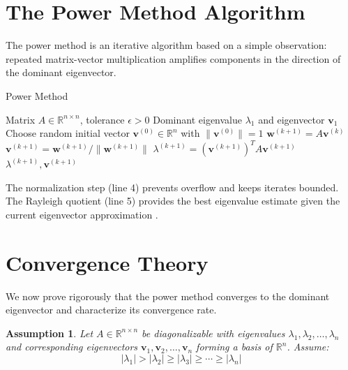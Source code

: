 \documentclass[11pt,a4paper]{article}
\newtheorem{assumption}{Assumption}
\begin{document}
\section{The Power Method Algorithm}
\label{sec:algorithm}

The power method is an iterative algorithm based on a simple observation: repeated matrix-vector multiplication amplifies components in the direction of the dominant eigenvector.

\begin{algorithm}[h]
\caption{Power Method}
\label{alg:power}
\begin{algorithmic}[1]
\Require Matrix $A \in \mathbb{R}^{n \times n}$, tolerance $\epsilon > 0$
\Ensure Dominant eigenvalue $\lambda_1$ and eigenvector $\mathbf{v}_1$
\State Choose random initial vector $\mathbf{v}^{(0)} \in \mathbb{R}^n$ with $\|\mathbf{v}^{(0)}\| = 1$
    \State $\mathbf{w}^{(k+1)} = A\mathbf{v}^{(k)}$ 
    \State $\mathbf{v}^{(k+1)} = \mathbf{w}^{(k+1)} / \|\mathbf{w}^{(k+1)}\|$ 
    \State $\lambda^{(k+1)} = (\mathbf{v}^{(k+1)})^T A \mathbf{v}^{(k+1)}$ 
        \State \Return $\lambda^{(k+1)}, \mathbf{v}^{(k+1)}$
    \EndIf
\EndFor
\end{algorithmic}
\end{algorithm}

The normalization step (line 4) prevents overflow and keeps iterates bounded. The Rayleigh quotient (line 5) provides the best eigenvalue estimate given the current eigenvector approximation \cite{trefethen1997}.

\section{Convergence Theory}
\label{sec:theory}

We now prove rigorously that the power method converges to the dominant eigenvector and characterize its convergence rate.

\begin{assumption}
\label{ass:main}
Let $A \in \mathbb{R}^{n \times n}$ be diagonalizable with eigenvalues $\lambda_1, \lambda_2, \ldots, \lambda_n$ and corresponding eigenvectors $\mathbf{v}_1, \mathbf{v}_2, \ldots, \mathbf{v}_n$ forming a basis of $\mathbb{R}^n$. Assume:
\begin{equation}
|\lambda_1| > |\lambda_2| \geq |\lambda_3| \geq \cdots \geq |\lambda_n|
\end{equation}
\end{assumption}
\end{document}
